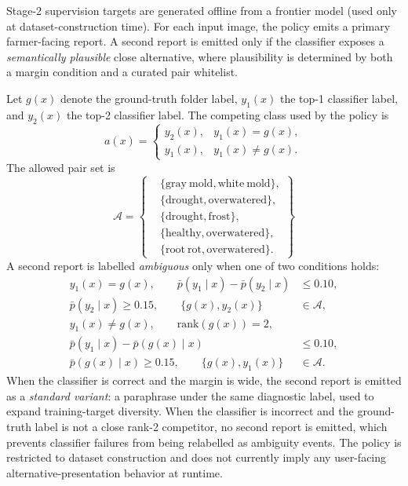Stage-2 supervision targets are generated offline from a frontier model
(used only at dataset-construction time). For each input image, the
policy emits a primary farmer-facing report. A second report is emitted
only if the classifier exposes a \emph{semantically plausible} close
alternative, where plausibility is determined by both a margin condition
and a curated pair whitelist.

Let $g(x)$ denote the ground-truth folder label, $y_1(x)$ the top-1
classifier label, and $y_2(x)$ the top-2 classifier label. The competing
class used by the policy is
\begin{equation}
a(x) =
\begin{cases}
y_2(x), & y_1(x) = g(x), \\
y_1(x), & y_1(x) \neq g(x).
\end{cases}
\label{eq:alt-class}
\end{equation}
The allowed pair set is
\begin{equation}
\mathcal{A} =
\left\{
\begin{aligned}
&\{\mathrm{gray\ mold}, \mathrm{white\ mold}\}, \\
&\{\mathrm{drought}, \mathrm{overwatered}\}, \\
&\{\mathrm{drought}, \mathrm{frost}\}, \\
&\{\mathrm{healthy}, \mathrm{overwatered}\}, \\
&\{\mathrm{root\ rot}, \mathrm{overwatered}\}.
\end{aligned}
\right\}
\label{eq:allowed-pairs}
\end{equation}
A second report is labelled \emph{ambiguous} only when one of two
conditions holds:
\begin{align}
y_1(x) = g(x), \qquad
\bar{p}(y_1 \mid x) - \bar{p}(y_2 \mid x) &\le 0.10, \nonumber \\
\bar{p}(y_2 \mid x) \ge 0.15, \qquad
\{g(x), y_2(x)\} &\in \mathcal{A}, \label{eq:amb-case-1} \\
y_1(x) \neq g(x), \qquad
\mathrm{rank}(g(x)) = 2, \nonumber \\
\bar{p}(y_1 \mid x) - \bar{p}(g(x) \mid x) &\le 0.10, \nonumber \\
\bar{p}(g(x) \mid x) \ge 0.15, \qquad
\{g(x), y_1(x)\} &\in \mathcal{A}. \label{eq:amb-case-2}
\end{align}
When the classifier is correct and the margin is wide, the second report
is emitted as a \emph{standard variant}: a paraphrase under the same
diagnostic label, used to expand training-target diversity. When the
classifier is incorrect and the ground-truth label is not a close
rank-2 competitor, no second report is emitted, which prevents
classifier failures from being relabelled as ambiguity events. The
policy is restricted to dataset construction and does not currently
imply any user-facing alternative-presentation behavior at runtime.
